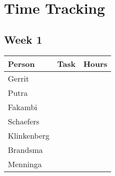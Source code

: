\chapter{Time Tracking}
\label{App: Time Tracking}

\section{Week 1}
\begin{tabularx}{\textwidth}{ l l l}
    \textbf{Person} & \textbf{Task} & Hours \\ \hline
	Gerrit & & \\
	Putra & & \\
	Fakambi & & \\
	Schaefers & & \\
	Klinkenberg & & \\
	Brandsma & & \\
	Menninga & & \\
\end{tabularx}